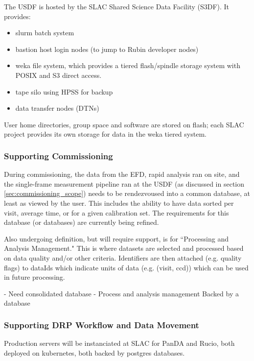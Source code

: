 The USDF is hosted by the SLAC Shared Science Data Facility (S3DF). It
provides:
\begin{itemize}
\item slurm batch system
\item bastion host login nodes (to jump to Rubin developer nodes)
\item weka file system, which provides a tiered flash/spindle storage
system with POSIX and S3 direct access.
\item tape silo using HPSS for backup
\item data transfer nodes (DTNs)
\end{itemize}

User home directories, group space and software are stored on flash;
each SLAC project provides its own storage for data in the weka tiered system.

\subsubsection{Supporting Commissioning}

During commissioning, the data from the EFD, rapid analysis ran on site, and the single-frame measurement pipeline ran at the USDF (as discussed in section \ref{sec:commissioning_scope}) needs to be rendezvoused into a common database, at least as viewed by the user. 
This includes the ability to have data sorted per visit, average time, or for a given calibration set.
The requirements for this database (or databases) are currently being refined.

Also undergoing definition, but will require support, is for ``Processing and Analysis Management."
This is where datasets are selected and processed based on data quality and/or other criteria.
Identifiers are then attached (e.g. quality flags) to dataIds which indicate units of data (e.g. (visit, ccd)) which can be used in future processing.



- Need consolidated database
- Process and analysis management 
Backed by a database



\subsubsection{Supporting DRP Workflow and Data Movement}

Production servers will be instanciated at SLAC for PanDA and Rucio,
both deployed on kubernetes, both backed by postgres databases.

